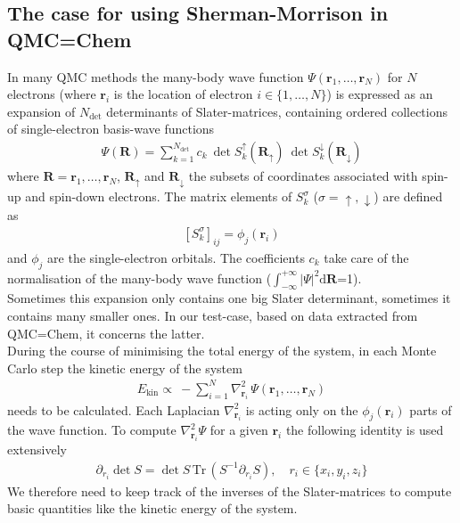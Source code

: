 \documentclass[11pt]{article}
\numberwithin{figure}{section}
\numberwithin{table}{section}
\begin{document}
		\subsection{The case for using Sherman-Morrison in QMC=Chem}
			In many QMC methods the many-body wave function $\Psi(\mathbf{r}_1,\ldots,\mathbf{r}_N)$ for $N$ electrons (where $\mathbf{r}_i$ is the location of electron $i\in\{1,\ldots ,N\}$) is expressed as an expansion of $N_\mathrm{det}$ determinants of Slater-matrices, containing ordered collections of single-electron basis-wave functions
			\begin{align}\label{eqn:mbwf}
				\Psi(\mathbf{R}) = \sum_{k=1}^{N_\mathrm{det}}c_k\:\det S_k^\uparrow(\mathbf{R}_\uparrow)\:\det S_k^\downarrow(\mathbf{R}_\downarrow)
			\end{align}
			where $\mathbf{R}=\mathbf{r}_1,\ldots,\mathbf{r}_N$, $\mathbf{R}_\uparrow$ and $\mathbf{R}_\downarrow$ the subsets of coordinates associated with spin-up and spin-down electrons. The matrix elements of $S_k^\sigma$ ($\sigma=\uparrow,\downarrow$) are defined as 
			\begin{align}
				\left[S_k^\sigma\right]_{ij} = \phi_j(\mathbf{r}_i)
			\end{align}
			and $\phi_j$ are the single-electron orbitals. The coefficients $c_k$ take care of the normalisation of the many-body wave function ($\int_{-\infty}^{+\infty}|\Psi|^2\mathrm{d}\mathbf{R}$=1).\\
			
			Sometimes this expansion only contains one big Slater determinant, sometimes it contains many smaller ones. In our test-case, based on data extracted from QMC=Chem, it concerns the latter.\\
				
			During the course of minimising the total energy of the system, in each Monte Carlo step the kinetic energy of the system
			\begin{align}
				E_\mathrm{kin} \propto\:-\!\sum_{i=1}^{N}\nabla^2_{\mathbf{r}_i}\,\Psi(\mathbf{r}_1,\ldots,\mathbf{r}_N)
			\end{align}
			needs to be calculated. Each Laplacian $\nabla^2_{\mathbf{r}_i}$ is acting only on the $\phi_j(\mathbf{r}_i)$ parts of the wave function. To compute $\nabla^2_{\mathbf{r}_i}\Psi$ for a given $\mathbf{r}_i$ the following identity is used extensively
			\begin{align}
				\partial_{r_i}\det S=\det S\,\mathrm{Tr}\,(S^{-1}\partial_{r_i} S),\quad r_i\in\{x_i,y_i,z_i\}
			\end{align}
			We therefore need to keep track of the inverses of the Slater-matrices to compute basic quantities like the kinetic energy of the system.\\
			
\end{document}
